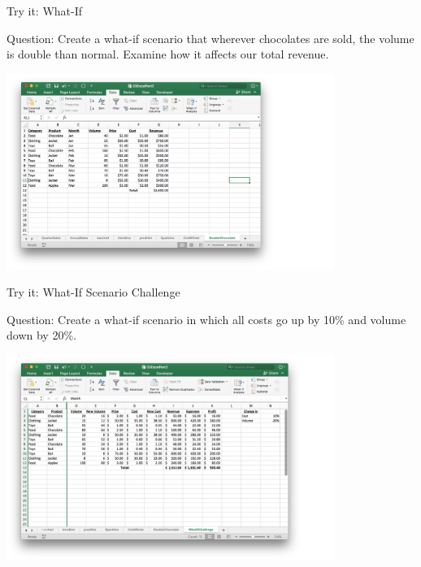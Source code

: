 \documentclass[xcolor=svgnames, handout]{beamer}
\begin{document}
\begin{frame}{Try it: What-If}
\begin{exampleblock}{Question:} Create a what-if scenario that wherever chocolates are sold, the volume is double than normal. Examine how it affects our total revenue. 
\end{exampleblock}
\begin{center}
\includegraphics[width=0.8\textwidth]{DoubleChocolate}
\end{center}
\end{frame}


\begin{frame}{Try it: What-If Scenario Challenge}
\begin{exampleblock}{Question:} Create a what-if scenario in which all costs go up by 10\% and volume down by 20\%. 
\end{exampleblock}
\begin{center}
\includegraphics[width=0.8\textwidth]{badcase}
\end{center}
\end{frame}
\end{document}
